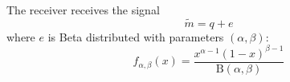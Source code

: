 \documentclass{article}
\begin{document}
The receiver receives the signal
\begin{equation}
	\widetilde{m}=q+e
\end{equation}
where $e$ is Beta distributed with parameters $(\alpha,\beta)$: 
\begin{equation}
	f_{\alpha,\beta}(x)=\frac{x^{\alpha-1}(1-x)^{\beta-1}}{\text{B}(\alpha,\beta)}
\end{equation}
\end{document}
